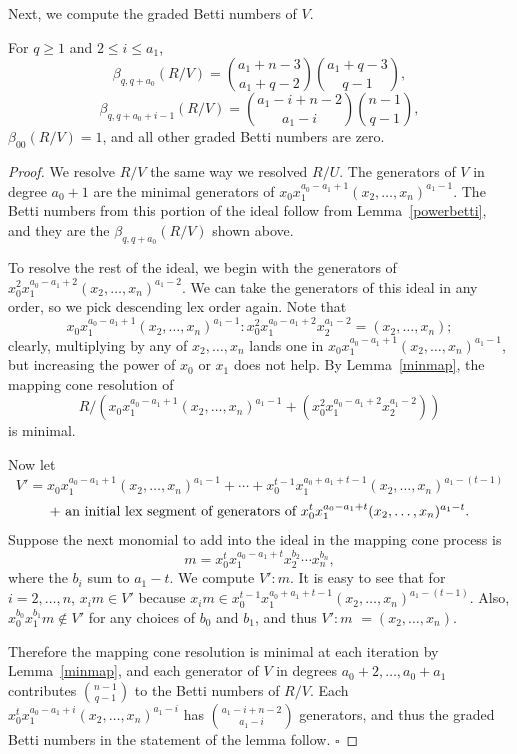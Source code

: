 \documentclass{article}
\begin{document}
Next, we compute the graded Betti numbers of $V$.

\begin{lemma}
\label{vbetti}
For $q \ge 1$ and $2 \le i \le a_1$, \[ \beta_{q,q+a_0}(R/V)={a_1+n-3 \choose a_1+q-2}{a_1+q-3 \choose q-1}, \] \[ \beta_{q,q+a_0+i-1}(R/V)={a_1-i+n-2 \choose a_1-i}{n-1 \choose q-1}, \] $\beta_{00}(R/V)=1$, and all other graded Betti numbers are zero.
\end{lemma}

\begin{proof}
We resolve $R/V$ the same way we resolved $R/U$. The generators of $V$ in degree $a_0+1$ are the minimal generators of $x_0x_1^{a_0-a_1+1}(x_2,\dots,x_n)^{a_1-1}$. The Betti numbers from this portion of the ideal follow from Lemma~\ref{powerbetti}, and they are the $\beta_{q,q+a_0}(R/V)$ shown above.

To resolve the rest of the ideal, we begin with the generators of $x_0^2x_1^{a_0-a_1+2}(x_2,\dots,x_n)^{a_1-2}$. We can take the generators of this ideal in any order, so we pick descending lex order again. Note that \[ x_0x_1^{a_0-a_1+1}(x_2,\dots,x_n)^{a_1-1}:x_0^2x_1^{a_0-a_1+2}x_2^{a_1-2} = (x_2,\dots,x_n); \] clearly, multiplying by any of $x_2,\dots,x_n$ lands one in $x_0x_1^{a_0-a_1+1}(x_2,\dots,x_n)^{a_1-1}$, but increasing the power of $x_0$ or $x_1$ does not help. By Lemma~\ref{minmap}, the mapping cone resolution of \[ R/(x_0x_1^{a_0-a_1+1}(x_2,\dots,x_n)^{a_1-1}+(x_0^2x_1^{a_0-a_1+2}x_2^{a_1-2}))\] is minimal.

Now let \[ V' = x_0x_1^{a_0-a_1+1}(x_2,\dots,x_n)^{a_1-1}+ \cdots + x_0^{t-1}x_1^{a_0+a_1+t-1}(x_2,\dots,x_n)^{a_1-(t-1)} \] \[ + \hbox{ an initial lex segment of generators of } x_0^tx_1^{a_0-a_1+t}(x_2,\dots,x_n)^{a_1-t}.\] Suppose the next monomial to add into the ideal in the mapping cone process is \[m=x_0^tx_1^{a_0-a_1+t}x_2^{b_2}\cdots x_n^{b_n},\] where the $b_i$ sum to $a_1-t$. We compute $V':m$. It is easy to see that for $i=2,\dots,n$, $x_im \in V'$ because $x_im \in x_0^{t-1}x_1^{a_0+a_1+t-1}(x_2,\dots,x_n)^{a_1-(t-1)}$. Also, $x_0^{b_0}x_1^{b_1}m \not \in V'$ for any choices of $b_0$ and $b_1$, and thus $V':m$ $=(x_2,\dots,x_n)$. 

Therefore the mapping cone resolution is minimal at each iteration by Lemma~\ref{minmap}, and each generator of $V$ in degrees $a_0+2,\dots,a_0+a_1$ contributes ${n-1 \choose q-1}$ to the Betti numbers of $R/V$. Each $x_0^tx_1^{a_0-a_1+i}(x_2,\dots,x_n)^{a_1-i}$ has ${a_1-i+n-2 \choose a_1-i}$ generators, and thus the graded Betti numbers in the statement of the lemma follow. \hfill $\square$
\end{proof}
\end{document}
